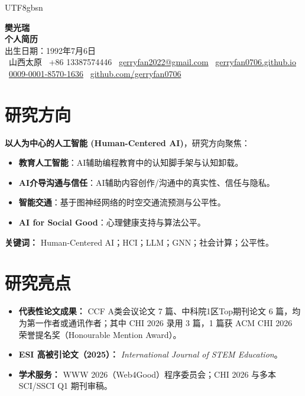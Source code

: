 \documentclass[a4paper,10pt]{article}
\newcommand{\cvlabel}[1]{\textbf{#1}}
\begin{document}
\ifPDFTeX
\begin{CJK*}{UTF8}{gbsn}
\fi

\pagestyle{empty}

\begin{center}
    \textbf{\LARGE 樊光瑞}\\[5pt]
    \textbf{\large 个人简历}\\[3pt]
    出生日期：1992年7月6日\\[2pt]
    \faMapMarker*~山西太原 \quad
    \faPhone~+86 13387574446 \quad
    \faEnvelope~\href{mailto:gerryfan2022@gmail.com}{gerryfan2022@gmail.com} \quad
    \faGlobe~\href{https://gerryfan0706.github.io}{gerryfan0706.github.io}\\[2pt]
    \faOrcid~\href{https://orcid.org/0009-0001-8570-1636}{0009-0001-8570-1636} \quad
    \faGithub~\href{https://github.com/gerryfan0706}{github.com/gerryfan0706}
\end{center}

\section*{研究方向}

\cvlabel{以人为中心的人工智能 (Human-Centered AI)}，研究方向聚焦：
\begin{itemize}[leftmargin=*]
    \item \cvlabel{教育人工智能}：AI辅助编程教育中的认知脚手架与认知卸载。
    \item \cvlabel{AI介导沟通与信任}：AI辅助内容创作/沟通中的真实性、信任与隐私。
    \item \cvlabel{智能交通}：基于图神经网络的时空交通流预测与公平性。
    \item \cvlabel{AI for Social Good}：心理健康支持与算法公平。
\end{itemize}
\noindent\cvlabel{关键词：} Human-Centered AI；HCI；LLM；GNN；社会计算；公平性。

\section*{研究亮点}
\begin{itemize}[leftmargin=*]
    \item \cvlabel{代表性论文成果：} CCF A类会议论文 7 篇、中科院1区Top期刊论文 6 篇，均为第一作者或通讯作者；其中 CHI 2026 录用 3 篇，1 篇获 ACM CHI 2026 荣誉提名奖（Honourable Mention Award）。
    \item \cvlabel{ESI 高被引论文（2025）：} \textit{International Journal of STEM Education}。
    \item \cvlabel{学术服务：} WWW 2026（Web4Good）程序委员会；CHI 2026 与多本 SCI/SSCI Q1 期刊审稿。
\end{itemize}


\end{CJK*}
\end{document}
